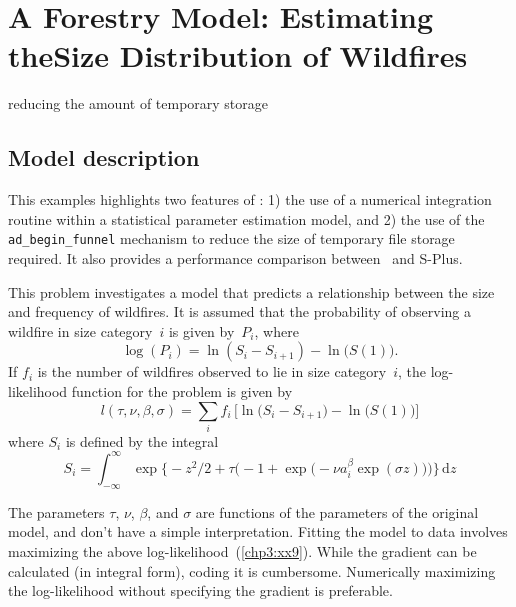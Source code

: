 \documentclass{admbmanual}
\begin{document}


\chapter{A Forestry Model: Estimating the\br Size Distribution of
 Wildfires}
%
{reducing the amount of temporary storage}

\section{Model description}

This examples highlights two features of \ADM: 1) the use of a numerical
integration routine within a statistical parameter estimation model, and 2) the
use of the \texttt{ad\_begin\_funnel} mechanism to reduce the size of temporary
file storage required. It also provides a performance comparison between \ADM\
and S-Plus.

This problem investigates a model that predicts a relationship between the size
and frequency of wildfires. It is assumed that the probability of observing a
wildfire in size category~$i$ is given by~$P_i$, where
\begin{equation*}
  \log(P_i)=\ln\left(S_i-S_{i+1}\right)-\ln\big(S(1)\big).
\end{equation*}
If $f_i$ is the number of wildfires observed to lie in size category~$i$, the
log-likelihood function for the problem is given by
\begin{equation}
  {
l(\tau,\nu,\beta,\sigma) =
   \sum_i f_i\,\Big[\ln\big(S_i-S_{i+1}\big)-\ln\big(S(1)\big)\Big]}
\label{chp3:xx9}
\end{equation}
where $S_i$ is defined by the integral
\begin{equation}
{
  S_i=\int_{-\infty}^\infty
  \exp\Big\{-z^2/2 +
  \tau\Big(-1+\exp\big(-\nu a_i^\beta\exp(\sigma z)\big)\Big) \Big\}
  \,\textrm{d}z}
\label{chp3:xx10}
\end{equation}

The parameters $\tau$, $\nu$, $\beta$, and $\sigma$ are functions of the
parameters of the original model, and don't have a simple interpretation.
Fitting the model to data involves maximizing the above
log-likelihood~(\ref{chp3:xx9}). %
While the gradient can be calculated (in integral form), coding it is
cumbersome. Numerically maximizing the log-likelihood without specifying the
gradient is preferable.
\end{document}
